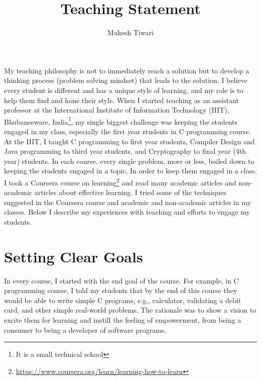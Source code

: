 \documentclass[a4paper]{article}
\title{Teaching Statement}
\author{Mukesh Tiwari}
\date{}
\begin{document}
\fontsize{12}{15}
\selectfont
\maketitle

My teaching philosophy is not to immediately reach a solution but to develop a 
thinking process (problem solving mindset) that leads to the solution. I believe every 
student is different and has a unique style of learning, and my role is to help them find 
and hone their style. When I started teaching as an assistant professor at the International Institute of Information 
Technology (IIIT), Bhubanesware, India\footnote{It is a small technical school},
my single biggest challenge was keeping the students engaged in my class, especially the first year 
students in C programming course. At the IIIT, I taught C programming to 
first year students, Compiler Design and Java programming to third year students, and
Cryptography to final year (4th year) students. In each course, every single 
problem,  more or less, boiled down to keeping the students engaged in a topic. 
In order to keep them engaged in a class, I took a Coursera course on 
learning\footnote{\url{https://www.coursera.org/learn/learning-how-to-learn}} and 
read many academic articles and non-academic articles about effective learning.
I tried some of the techniques suggested in the Coursera course and 
academic and non-academic articles in my classes. Below I 
describe my experiences with teaching and efforts to engage my students. 


\section{Setting Clear Goals}
In every course, I started with the end goal of the course. For example, 
in C programming course, I told my students that by the end of this 
course they would be 
able to write simple C programs, e.g., calculator, 
validating a debit card, and other simple real-world problems. The rationale was 
to show a vision to excite them 
for learning and instill the feeling of empowerment, from
being a consumer to being a developer of software programs.
\end{document}
